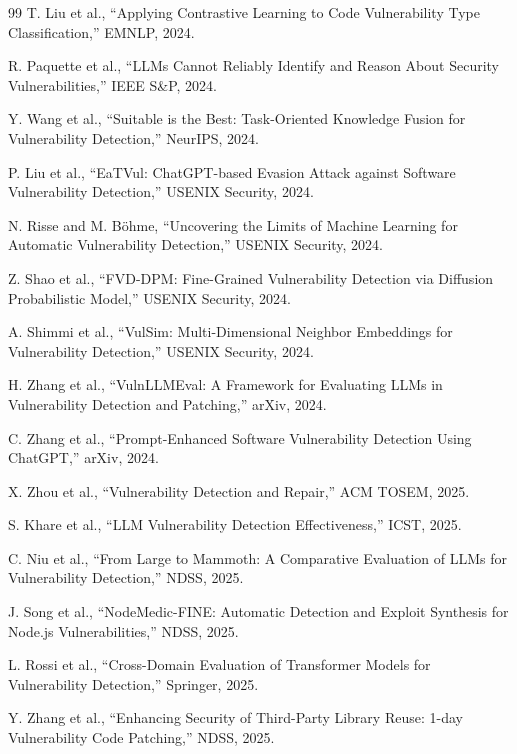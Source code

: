 \documentclass[11pt,a4paper,onecolumn]{article}
\begin{document}
\begin{thebibliography}{99}
T. Liu et al., ``Applying Contrastive Learning to Code Vulnerability Type Classification,'' EMNLP, 2024.

R. Paquette et al., ``LLMs Cannot Reliably Identify and Reason About Security Vulnerabilities,'' IEEE S\&P, 2024.

Y. Wang et al., ``Suitable is the Best: Task-Oriented Knowledge Fusion for Vulnerability Detection,'' NeurIPS, 2024.

P. Liu et al., ``EaTVul: ChatGPT-based Evasion Attack against Software Vulnerability Detection,'' USENIX Security, 2024.

N. Risse and M. Böhme, ``Uncovering the Limits of Machine Learning for Automatic Vulnerability Detection,'' USENIX Security, 2024.

Z. Shao et al., ``FVD-DPM: Fine-Grained Vulnerability Detection via Diffusion Probabilistic Model,'' USENIX Security, 2024.

A. Shimmi et al., ``VulSim: Multi-Dimensional Neighbor Embeddings for Vulnerability Detection,'' USENIX Security, 2024.

H. Zhang et al., ``VulnLLMEval: A Framework for Evaluating LLMs in Vulnerability Detection and Patching,'' arXiv, 2024.

C. Zhang et al., ``Prompt-Enhanced Software Vulnerability Detection Using ChatGPT,'' arXiv, 2024.

X. Zhou et al., ``Vulnerability Detection and Repair,'' ACM TOSEM, 2025.

S. Khare et al., ``LLM Vulnerability Detection Effectiveness,'' ICST, 2025.

C. Niu et al., ``From Large to Mammoth: A Comparative Evaluation of LLMs for Vulnerability Detection,'' NDSS, 2025.

J. Song et al., ``NodeMedic-FINE: Automatic Detection and Exploit Synthesis for Node.js Vulnerabilities,'' NDSS, 2025.

L. Rossi et al., ``Cross-Domain Evaluation of Transformer Models for Vulnerability Detection,'' Springer, 2025.

Y. Zhang et al., ``Enhancing Security of Third-Party Library Reuse: 1-day Vulnerability Code Patching,'' NDSS, 2025.


\end{thebibliography}
\end{document}
